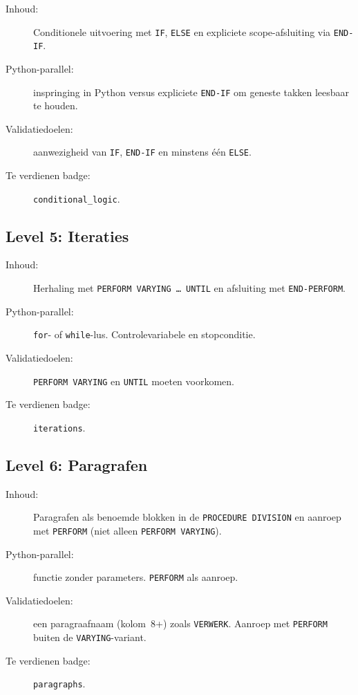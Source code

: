 \begin{description}
    \item[Inhoud:] Conditionele uitvoering met \texttt{IF}, \texttt{ELSE} en expliciete scope-afsluiting via \texttt{END-IF}.
    \item[Python-parallel:] inspringing in Python versus expliciete \texttt{END-IF} om geneste takken leesbaar te houden.
    \item[Validatiedoelen:] aanwezigheid van \texttt{IF}, \texttt{END-IF} en minstens één \texttt{ELSE}.
    \item[Te verdienen badge:] \texttt{conditional\_logic}.
\end{description}

\subsection{Level 5: Iteraties}
\label{subsec:poc-level-5}

\begin{description}
    \item[Inhoud:] Herhaling met \texttt{PERFORM VARYING \ldots\ UNTIL} en afsluiting met \texttt{END-PERFORM}.
    \item[Python-parallel:] \texttt{for}- of \texttt{while}-lus. Controlevariabele en stopconditie.
    \item[Validatiedoelen:] \texttt{PERFORM VARYING} en \texttt{UNTIL} moeten voorkomen.
    \item[Te verdienen badge:] \texttt{iterations}.
\end{description}

\subsection{Level 6: Paragrafen}
\label{subsec:poc-level-6}

\begin{description}
    \item[Inhoud:] Paragrafen als benoemde blokken in de \texttt{PROCEDURE DIVISION} en aanroep met \texttt{PERFORM} (niet alleen \texttt{PERFORM VARYING}).
    \item[Python-parallel:] functie zonder parameters. \texttt{PERFORM} als aanroep.
    \item[Validatiedoelen:] een paragraafnaam (kolom~8+) zoals \texttt{VERWERK}. Aanroep met \texttt{PERFORM} buiten de \texttt{VARYING}-variant.
    \item[Te verdienen badge:] \texttt{paragraphs}.
\end{description}

